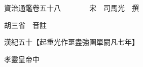 










 


 
 


 

  
  
  
  
  





  
  
  
  
  
 
  

  

  
  
  



  

 
 

  
   




  

  
  


  　　資治通鑑卷五十八　　　　宋　司馬光　撰

　　胡三省　音註

　　漢紀五十【起重光作噩盡強圉單閼凡七年】

　　孝靈皇帝中

